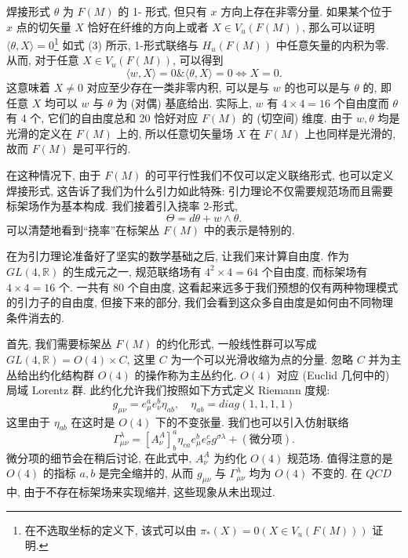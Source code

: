 \documentclass{article}
\begin{document}
焊接形式 $\theta$ 为 $F(M)$ 的 1- 形式, 但只有 $x$ 方向上存在非零分量. 如果某个位于 $x$ 点的切矢量 $X$ 恰好在纤维的方向上或者 $X\in V_{u}(F(M))$, 那么可以证明 $\langle\theta,X\rangle=0$\footnote{在不选取坐标的定义下, 该式可以由 $\pi_{*}(X)=0(X\in V_{u}(F(M)))$ 证明.} 如式 (3) 所示, 1-形式联络与 $H_{u}(F(M))$ 中任意矢量的内积为零. 从而, 对于任意 $X\in V_{u}(F(M))$, 可以得到
\begin{equation}
\langle w, X\rangle=0\&\langle \theta, X\rangle=0\Leftrightarrow X=0.
\end{equation}
这意味着 $X\neq 0$ 对应至少存在一类非零内积, 可以是与 $w$ 的也可以是与 $\theta$ 的, 即任意 $X$ 均可以 $w$ 与 $\theta$ 为 (对偶) 基底给出. 实际上, $w$ 有 $4\times4=16$ 个自由度而 $\theta$ 有 4 个, 它们的自由度总和 20 恰好对应 $F(M)$ 的 (切空间) 维度. 由于 $w,\theta$ 均是光滑的定义在 $F(M)$ 上的, 所以任意切矢量场 $X$ 在 $F(M)$ 上也同样是光滑的, 故而 $F(M)$ 是可平行的.

在这种情况下, 由于 $F(M)$ 的可平行性我们不仅可以定义联络形式, 也可以定义焊接形式, 这告诉了我们为什么引力如此特殊: 引力理论不仅需要规范场而且需要标架场作为基本构成. 我们接着引入挠率 2-形式,
\begin{equation}
\Theta=d\theta+w\wedge \theta.
\end{equation}
可以清楚地看到“挠率”在标架丛 $F(M)$ 中的表示是特别的.

在为引力理论准备好了坚实的数学基础之后, 让我们来计算自由度. 作为 $GL(4,\mathbb{R})$ 的生成元之一, 规范联络场有 $4^{2}\times4=64$ 个自由度, 而标架场有 $4\times4=16$ 个. 一共有 80 个自由度, 这看起来远多于我们预想的仅有两种物理模式的引力子的自由度, 但接下来的部分, 我们会看到这众多自由度是如何由不同物理条件消去的.

首先, 我们需要标架丛 $F(M)$ 的约化形式, 一般线性群可以写成  $GL(4,\mathbb{R})=O(4)\times C$, 这里 $C$ 为一个可以光滑收缩为点的分量. 忽略 $C$ 并为主丛给出约化结构群 $O(4)$ 的操作称为主丛约化. $O(4)$ 对应 (Euclid 几何中的) 局域 Lorentz 群. 此约化允许我们按照如下方式定义 Riemann 度规:
\begin{equation}
g_{\mu\nu}=e_{\mu}^{a}e^{b}_{\nu}\eta_{ab}, \quad\eta_{ab}=diag(1,1,1,1)
\end{equation}
这里由于 $\eta_{ab}$ 在这时是 $O(4)$ 下的不变张量. 我们也可以引入仿射联络
\begin{equation}
\Gamma_{\mu\nu}^{\lambda}=[A_{\nu}^{A}]_{b}^{a}\eta_{ca}e_{\mu}^{b}e_{\sigma}^{c}g^{\sigma\lambda}+(\text{微分项}).
\end{equation}
微分项的细节会在稍后讨论, 在此式中, $A_{\nu}^{A}$ 为约化 $O(4)$ 规范场. 值得注意的是 $O(4)$ 的指标 $a,b$ 是完全缩并的, 从而 $g_{\mu\nu}$ 与 $\Gamma_{\mu\nu}^{\lambda}$ 均为 $O(4)$ 不变的. 在 $QCD$ 中, 由于不存在标架场来实现缩并, 这些现象从未出现过.
\end{document}
